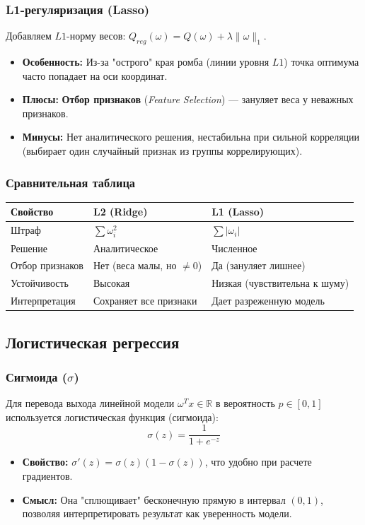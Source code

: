 \documentclass[12pt]{article}
\begin{document}
\subsubsection{L1-регуляризация (Lasso)}
Добавляем $L1$-норму весов: $Q_{reg}(\omega) = Q(\omega) + \lambda \|\omega\|_1$.
\begin{itemize}
    \item \textbf{Особенность:} Из-за "острого" края ромба (линии уровня $L1$) точка оптимума часто попадает на оси координат.
    \item \textbf{Плюсы:} \textbf{Отбор признаков} (\textit{Feature Selection}) — зануляет веса у неважных признаков.
    \item \textbf{Минусы:} Нет аналитического решения, нестабильна при сильной корреляции (выбирает один случайный признак из группы коррелирующих).
\end{itemize}

\subsubsection{Сравнительная таблица}
\begin{table}[h!]
\centering
\begin{tabular}{@{}lll@{}}
\toprule
\textbf{Свойство} & \textbf{L2 (Ridge)} & \textbf{L1 (Lasso)} \\ \midrule
Штраф & $\sum \omega_i^2$ & $\sum |\omega_i|$ \\
Решение & Аналитическое & Численное \\
Отбор признаков & Нет (веса малы, но $\neq 0$) & Да (зануляет лишнее) \\
Устойчивость & Высокая & Низкая (чувствительна к шуму) \\
Интерпретация & Сохраняет все признаки & Дает разреженную модель \\ \bottomrule
\end{tabular}
\end{table}

\subsection{Логистическая регрессия}

\subsubsection{Сигмоида ($\sigma$)}
Для перевода выхода линейной модели $\omega^T x \in \mathbb{R}$ в вероятность $p \in [0, 1]$ используется логистическая функция (сигмоида):
\[ \sigma(z) = \frac{1}{1 + e^{-z}} \]
\begin{itemize}
    \item \textbf{Свойство:} $\sigma'(z) = \sigma(z)(1 - \sigma(z))$, что удобно при расчете градиентов.
    \item \textbf{Смысл:} Она "сплющивает" бесконечную прямую в интервал $(0, 1)$, позволяя интерпретировать результат как уверенность модели.
\end{itemize}
\end{document}
